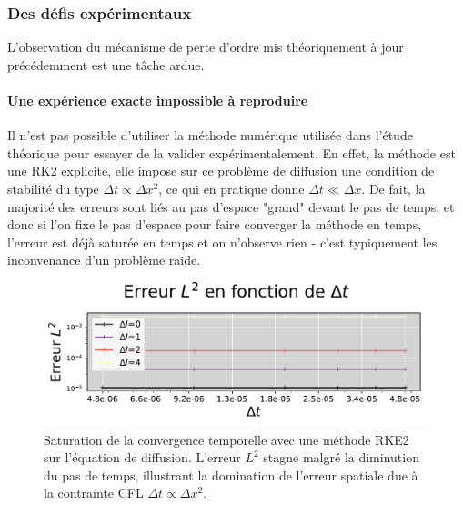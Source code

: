 \subsubsection{Des défis expérimentaux}
    L'observation du mécanisme de perte d'ordre mis théoriquement à jour précédemment 
    est une tâche ardue.
    \paragraph{Une expérience exacte impossible à reproduire}
        Il n'est pas possible d'utiliser la méthode numérique utilisée dans l'étude théorique pour essayer de la valider expérimentalement. 
        En effet, la méthode est une RK2 explicite, elle impose sur ce problème de diffusion une condition de stabilité du type $\Delta t \propto \Delta x^2$,
        ce qui en pratique donne $\Delta t \ll \Delta x$. De fait, la majorité des erreurs sont liés au pas d'espace "grand" devant le pas de temps, et donc
        si l'on fixe le pas d'espace pour faire converger la méthode en temps, l'erreur est déjà saturée en temps et on n'observe rien - c'est typiquement les inconvenance d'un problème raide. 
        \begin{figure}[htbp]
            \centering
            \includegraphics[width=\textwidth]{media/4_travail/1_AMR/convergence/convergence_temps_SATURATION.pdf}
            \caption{Saturation de la convergence temporelle avec une méthode RKE2 sur l'équation de diffusion. 
                        L'erreur $L^2$ stagne malgré la diminution du pas de temps, illustrant la domination 
                        de l'erreur spatiale due à la contrainte CFL $\Delta t \propto \Delta x^2$.}
            \label{fig:saturation_rke2}
        \end{figure}
